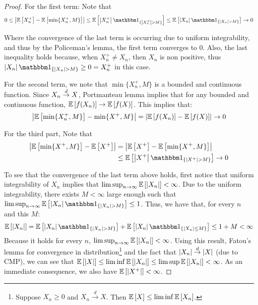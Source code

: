 \documentclass[12pt, letterpaper]{paper}
\begin{document}
\begin{question}
\begin{proof}
    For the first term: Note that
    \begin{equation*}
      0 \leq \abs{\exV{X_n^+}-\exV{\min\{X_n^+,M\}}} \leq
      \exV{\abs{X_n^+}\indicate{\abs{X_n^+}> M}}\le
      \exV{\abs{X_n}\indicate{\abs{X_n}> M}}\rightarrow 0
    \end{equation*}

    Where the convergence of the last term is occurring due to uniform integrability,
    and thus by the Policeman's lemma, the first term converges to
    0. Also, the last inequality holds because, when $X_{n}^{+}\ne
    X_{n}$, then $X_{n}$ is non positive, thus $\abs{X_{n}}\indicate{\abs{X_n}> M}\ge0=X_{n}^{+}$
    in this case.

    For the second term, we note that $\min\{X_n^+, M\}$ is a bounded
    and continuous function. Since $X_n \overset{d}{\to} X$, Portmanteau
    lemma implies that for any bounded
    and continuous function, $\mathbb{E} \left [ f(X_n) \right ] \rightarrow \mathbb{E} \left [ f(X) \right ]$. This implies
    that:
    \begin{equation*}
      \left \lvert  \mathbb{E} \left [ \min\{X_n^+, M\} \right ] - \min\{X^+, M \} \right \rvert =
      \left \lvert \mathbb{E} \left [ f(X_n) \right ] - \mathbb{E} \left [ f(X) \right ] \right \rvert \rightarrow 0 
    \end{equation*}


    For the third part, Note that
    \begin{align*}
     \abs{\exV{\min\{X^+,M\}}-\exV{X^+}} &=
                                           \abs{\exV{X^+}-\exV{\min\{X^+,M\}}}\\
                                         &\leq
                                           \exV{\abs{X^+}\indicate{\abs{X^+}
                                           > M}} \rightarrow 0\\
    \end{align*}

To see that the convergence of the last term above holds, first notice that uniform integrability of $X_n$ implies that $\limsup_{n\to\infty}{\mathbb{E} \left [ \left \lvert X_n \right \rvert \right ]}<\infty$. Due to the uniform integrability, there exists $M<\infty$ large enough such that $\limsup_{n\to\infty}{\exV{\abs{X_n}\indicate{\abs{X_n}> M}}}\le 1$. Thus, we have that, for every $n$ and this $M$:
\begin{equation}
\begin{split}
	\exV{\abs{X_n}}=\exV{\abs{X_n}\indicate{\abs{X_n}> M}}+\exV{\abs{X_n}\indicate{\abs{X_n}\le  M}}\le 1+M < \infty
\end{split}
\end{equation}
Because it holds for every $n$, $\limsup_{n\to\infty}{\mathbb{E} \left [ \left \lvert X_n \right \rvert \right ]}<\infty$. Using this result, Fatou's lemma for convergence in distribution\footnote{Suppose $X_n\ge 0$ and $X_n\overset{d}{\to}X$. Then $\mathbb{E} \left [ X \right ]\le \liminf{\mathbb{E} \left [ X_n \right ]}$.} and the fact that $\left \lvert X_n \right \rvert\overset{d}{\to}\left \lvert X \right \rvert$ (due to CMP), we can see that $\mathbb{E} \left [ \left \lvert X \right \rvert \right ]\le \liminf{\mathbb{E} \left [ \left \lvert X_n \right \rvert \right ]}\le \limsup{\mathbb{E} \left [ \left \lvert X_n \right \rvert \right ]} <\infty$. As an immediate consequence, we also have $\mathbb{E} \left [ \left \lvert X^{+} \right \rvert \right ]<\infty$.


\end{proof}
\end{question}
\end{document}
